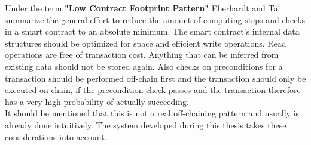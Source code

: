 \documentclass[a4paper,12pt]{scrartcl}
\begin{document}
Under the term \textbf{"Low Contract Footprint Pattern"} Eberhardt and Tai \cite{eberhardt2017or} summarize the general effort to reduce the amount of computing steps and checks in a smart contract to an absolute minimum. The smart contract's internal data structures should be optimized for space and efficient write operations. Read operations are free of transaction cost. Anything that can be inferred from existing data should not be stored again. Also checks on preconditions for a transaction should be performed off-chain first and the transaction should only be executed on chain, if the precondition check passes and the transaction therefore has a very high probability of actually succeeding.\\
It should be mentioned that this is not a real off-chaining pattern and usually is already done intuitively. The system developed during this thesis takes these considerations into account.\\
\end{document}
